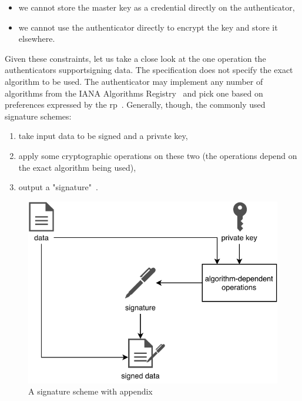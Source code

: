 \begin{itemize}
	\item we cannot store the master key as a credential directly on the authenticator,
	\item we cannot use the authenticator directly to encrypt the key and store it elsewhere.
\end{itemize}

Given these constraints, let us take a close look at the one operation the authenticators support\textemdash signing data.
The  specification does not specify the exact algorithm to be used. The authenticator
may implement any number of algorithms from the IANA  Algorithms Registry~\cite{iana:cose-algorithms} and pick
one based on preferences expressed by the \gls{rp}~\cite{fido:webautn}. Generally, though, the commonly used signature schemes:

\begin{enumerate}
	\item take input data to be signed and a private key,
	\item apply some cryptographic operations on these two (the operations depend on the exact algorithm being used),
	\item output a "signature"~\cite{rfc8017}.
\end{enumerate}

\begin{figure}[H]
	\centering\includegraphics[width=\textwidth]{images/signature}
	\caption{A signature scheme with appendix}
	\label{fig:a-signature-scheme-with-appendix}
\end{figure}

